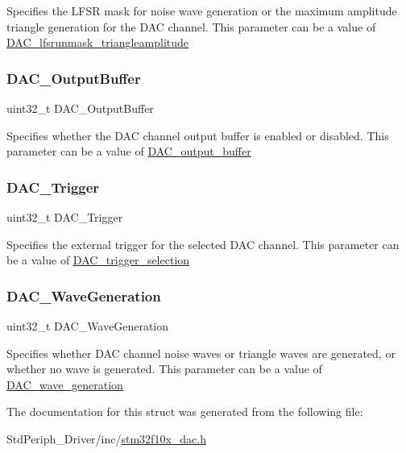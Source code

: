 Specifies the L\+F\+SR mask for noise wave generation or the maximum amplitude triangle generation for the D\+AC channel. This parameter can be a value of \mbox{\hyperlink{group___d_a_c__lfsrunmask__triangleamplitude}{D\+A\+C\+\_\+lfsrunmask\+\_\+triangleamplitude}} \mbox{\label{struct_d_a_c___init_type_def_a22d062287d8cbba2342585ea7944f61d}} 
\subsubsection{\texorpdfstring{DAC\_OutputBuffer}{DAC\_OutputBuffer}}
{\footnotesize\ttfamily uint32\+\_\+t D\+A\+C\+\_\+\+Output\+Buffer}

Specifies whether the D\+AC channel output buffer is enabled or disabled. This parameter can be a value of \mbox{\hyperlink{group___d_a_c__output__buffer}{D\+A\+C\+\_\+output\+\_\+buffer}} \mbox{\label{struct_d_a_c___init_type_def_ae1edfee233aee962b357cbc3994b330b}} 
\subsubsection{\texorpdfstring{DAC\_Trigger}{DAC\_Trigger}}
{\footnotesize\ttfamily uint32\+\_\+t D\+A\+C\+\_\+\+Trigger}

Specifies the external trigger for the selected D\+AC channel. This parameter can be a value of \mbox{\hyperlink{group___d_a_c__trigger__selection}{D\+A\+C\+\_\+trigger\+\_\+selection}} \mbox{\label{struct_d_a_c___init_type_def_a3dfc2e2197154ed20469e57ccff591d3}} 
\subsubsection{\texorpdfstring{DAC\_WaveGeneration}{DAC\_WaveGeneration}}
{\footnotesize\ttfamily uint32\+\_\+t D\+A\+C\+\_\+\+Wave\+Generation}

Specifies whether D\+AC channel noise waves or triangle waves are generated, or whether no wave is generated. This parameter can be a value of \mbox{\hyperlink{group___d_a_c__wave__generation}{D\+A\+C\+\_\+wave\+\_\+generation}} 

The documentation for this struct was generated from the following file\+:\begin{DoxyCompactItemize}
\item 
Std\+Periph\+\_\+\+Driver/inc/\mbox{\hyperlink{stm32f10x__dac_8h}{stm32f10x\+\_\+dac.\+h}}\end{DoxyCompactItemize}
